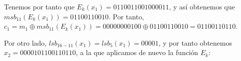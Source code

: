 \documentclass[fleqn]{article}
\begin{document}
    Tenemos por tanto que $E_k(x_1) = 0110011001000011$, y así obtenemos que $msb_{11}(E_k(x_1)) = 01100110010$. Por tanto, 
    $c_1 = m_1 \oplus msb_{11}(E_k(x_1)) = 00000000100 \oplus 01100110010 = 01100110110$.

    Por otro lado, $lsb_{16-11}(x_1) = lsb_5(x_1) = 00001$, y por tanto obtenemos $x_2 = 0000101100110110$, a la que aplicamos de nuevo 
    la función $E_k$:

    
\end{document}
